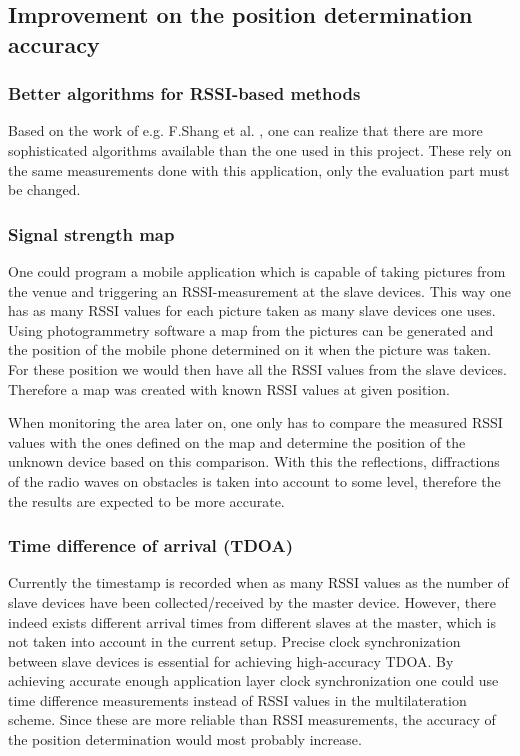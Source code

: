\documentclass[11pt,a4paper]{article}
\begin{document}
\subsection{Improvement on the position determination accuracy}

\subsubsection{Better algorithms for RSSI-based methods}

Based on the work of e.g. F.Shang et al. \cite{Shang}, one can realize that there are more sophisticated algorithms available than the one used in this project. These rely on the same measurements done with this application, only the evaluation part must be changed.

\subsubsection{Signal strength map}

One could program a mobile application which is capable of taking pictures from the venue and triggering an RSSI-measurement at the slave devices. This way one has as many RSSI values for each picture taken as many slave devices one uses. Using photogrammetry software a map from the pictures can be generated and the position of the mobile phone determined on it when the picture was taken. For these position we would then have all the RSSI values from the slave devices. Therefore a map was created with known RSSI values at given position.

When monitoring the area later on, one only has to compare the measured RSSI values with the ones defined on the map and determine the position of the unknown device based on this comparison. With this the reflections, diffractions of the radio waves on obstacles is taken into account to some level, therefore the the results are expected to be more accurate.

\subsubsection{Time difference of arrival (TDOA)}

Currently the timestamp is recorded when as many RSSI values as the number of slave devices have been collected/received by the master device. However, there indeed exists different arrival times from different slaves at the master, which is not taken into account in the current setup. Precise clock synchronization between slave devices is essential for achieving high-accuracy TDOA. By achieving accurate enough application layer clock synchronization one could use time difference measurements instead of RSSI values in the multilateration scheme. Since these are more reliable than RSSI measurements, the accuracy of the position determination would most probably increase.
\end{document}
